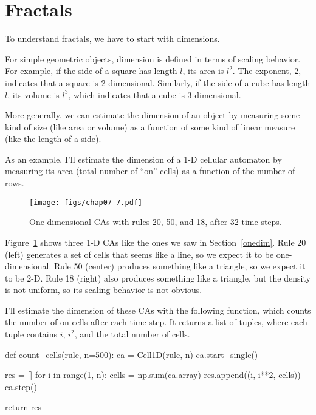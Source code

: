 \documentclass[12pt]{book}
\theoremstyle{exercise}
\begin{document}
\section{Fractals}
\label{fractals}

To understand fractals, we have to start with dimensions.


For simple geometric objects, dimension is defined in terms of scaling
behavior.  For example, if the side of a square has length $l$, its
area is $l^2$.  The exponent, 2, indicates that a square is
2-dimensional.  Similarly, if the side of a cube has length $l$, its
volume is $l^3$, which indicates that a cube is 3-dimensional.


More generally, we can estimate the dimension of an object by
measuring some kind of size (like area or volume) as a function of some kind of linear measure (like the length of a side).

As an example, I'll estimate the dimension of a 1-D cellular
automaton by measuring its area (total number of ``on'' cells)
as a function of the number of rows.


\begin{figure}
\centerline{\texttt{[image: figs/chap07-7.pdf]}}
\caption{One-dimensional CAs with rules 20, 50, and 18, after 32 time steps.}
\label{chap07-7}
\end{figure}

Figure~\ref{chap07-7} shows three 1-D CAs like the ones we saw
in Section~\ref{onedim}.  Rule 20 (left) generates
a set of cells that seems like a line, so we expect it to be one-dimensional.  Rule 50 (center) produces something like a triangle, so
we expect it to be 2-D.  Rule 18 (right) also produces something like a
triangle, but the density is not uniform, so its scaling behavior is
not obvious.


I'll estimate the dimension of these CAs with the following function,
which counts the number of on cells after each time step.
It returns a list of tuples, where each tuple contains $i$,
$i^2$, and the total number of cells.

\begin{code}
def count_cells(rule, n=500):
    ca = Cell1D(rule, n)
    ca.start_single()

    res = []
    for i in range(1, n):
        cells = np.sum(ca.array)
        res.append((i, i**2, cells))
        ca.step()

    return res
\end{code}
\end{document}
